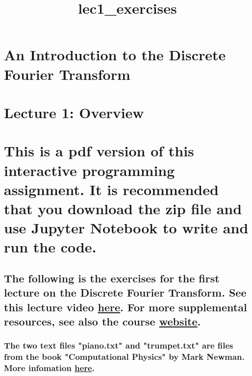 \documentclass[11pt]{article}
\title{lec1\_exercises}
\begin{document}
    
    
    \maketitle
    
    

    
    \section{An Introduction to the Discrete Fourier
Transform}\label{an-introduction-to-the-discrete-fourier-transform}

\section{Lecture 1: Overview}\label{lecture-1-overview}

\section{This is a pdf version of this interactive programming
assignment. It is recommended that you download the zip file and use
Jupyter Notebook to write and run the
code.}\label{this-is-a-pdf-version-of-this-interactive-programming-assignment.-it-is-recommended-that-you-download-the-zip-file-and-use-jupyter-notebook-to-write-and-run-the-code.}

\subsection{\texorpdfstring{The following is the exercises for the first
lecture on the Discrete Fourier Transform. See this lecture video
\href{https://www.youtube.com/watch?v=t8idDnMtNx8}{here}. For more
supplemental resources, see also the course
\href{https://longbaonguyen.github.io/courses/dft/discrete_fourier.html}{website}.}{The following is the exercises for the first lecture on the Discrete Fourier Transform. See this lecture video here. For more supplemental resources, see also the course website.}}\label{the-following-is-the-exercises-for-the-first-lecture-on-the-discrete-fourier-transform.-see-this-lecture-video-here.-for-more-supplemental-resources-see-also-the-course-website.}

\subsubsection{\texorpdfstring{The two text files "piano.txt" and
"trumpet.txt" are files from the book "Computational Physics" by Mark
Newman. More infomation
\href{http://www-personal.umich.edu/~mejn/cp/}{here}.}{The two text files "piano.txt" and "trumpet.txt" are files from the book "Computational Physics" by Mark Newman. More infomation here.}}\label{the-two-text-files-piano.txt-and-trumpet.txt-are-files-from-the-book-computational-physics-by-mark-newman.-more-infomation-here.}
\end{document}
